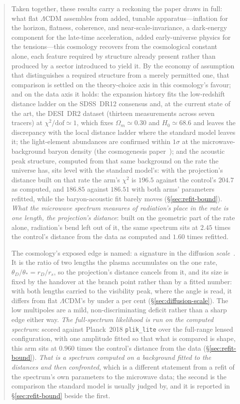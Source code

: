 \documentclass[11pt,a4paper]{article}
\theoremstyle{plain}
\theoremstyle{definition}
\theoremstyle{remark}
\begin{document}
\begin{abstract}
Taken together, these results carry a reckoning the paper draws in full: what flat $\Lambda$CDM assembles from added, tunable apparatus---inflation for the horizon, flatness, coherence, and near-scale-invariance, a dark-energy component for the late-time acceleration, added early-universe physics for the tensions---this cosmology recovers from the cosmological constant alone, each feature required by structure already present rather than produced by a sector introduced to yield it. By the economy of assumption that distinguishes a required structure from a merely permitted one, that comparison is settled on the theory-choice axis in this cosmology's favour; and on the data axis it holds: the expansion history fits the low-redshift distance ladder on the SDSS~DR12 consensus and, at the current state of the art, the DESI~DR2 dataset (thirteen measurements across seven tracers) at $\chi^2/\text{dof}\simeq1$, which fixes $\Omega_m\simeq0.30$ and $H_0\simeq68.6$ and leaves the discrepancy with the local distance ladder where the standard model leaves it; the light-element abundances are confirmed within $1\sigma$ at the microwave-background baryon density (the cosmogenesis paper~\cite{JanzenCosmogenesis}); and the acoustic peak structure, computed from that same background on the rate the universe has, sits level with the standard model's: with the projection's distance built on that rate the arm's $\chi^{2}$ is $196.5$ against the control's $204.7$ as computed, and $186.85$ against $186.51$ with both arms' parameters refitted, while the baryon-acoustic fit barely moves (\S\ref{sec:refit-bound}). \emph{What the microwave spectrum measures of radiation's place in the rate is one length, the projection's distance}: built on the geometric part of the rate alone, radiation's bend left out of it, the same spectrum sits at $2.45$ times the control's distance from the data as computed and $1.60$ times refitted. 

The cosmology's exposed edge is named: a signature in the diffusion \emph{scale}~\cite{Silk1968}. It is the ratio of two lengths the plasma accumulates on the one rate, $\theta_D/\theta_*=r_D/r_s$, so the projection's distance cancels from it, and its size is fixed by the handover at the branch point rather than by a fitted number: with both lengths carried to the visibility peak, where the angle is read, it differs from flat $\Lambda$CDM's by under a per cent (\S\ref{sec:diffusion-scale}). The low multipoles are a mild, non-discriminating
deficit rather than a sharp edge either way. \emph{The full-spectrum
likelihood is run on the computed spectrum}: scored against Planck~2018 \texttt{plik\_lite} over the
full-range lensed configuration, with one amplitude fitted so that what is compared is shape, this arm sits
at $0.960$ times the control's distance from the data (\S\ref{sec:refit-bound}). \emph{That is a spectrum
computed on a background fitted to the distances and then confronted}, which is a different statement from a
refit of the spectrum's own parameters to the microwave data; the second is the comparison the standard model
is usually judged by, and it is reported in \S\ref{sec:refit-bound} beside the first. 


\end{abstract}
\end{document}
